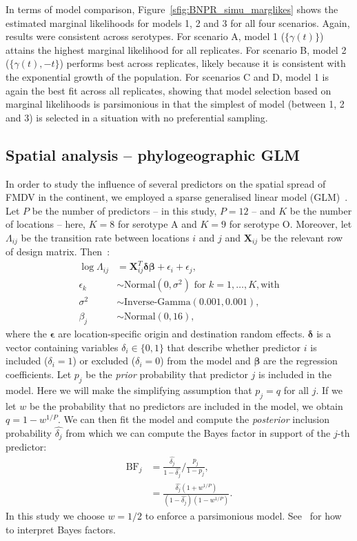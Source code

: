 \documentclass[a4paper,10pt]{article}
\begin{document}
In terms of model comparison, Figure~\ref{sfig:BNPR_simu_marglikes} shows the estimated marginal likelihoods for models 1, 2 and 3 for all four scenarios.
Again, results were consistent across serotypes. 
For scenario A, model 1 ($ \{ \gamma(t) \}$) attains the highest marginal likelihood for all replicates.
For scenario B, model 2 ($ \{ \gamma(t), -t\}$) performs best across replicates, likely because it is consistent with the exponential growth of the population.
For scenarios C and D, model 1 is again the best fit across all replicates, showing that model selection based on marginal likelihoods is parsimonious in that the simplest of model (between 1, 2 and 3) is selected in a situation with no preferential sampling.

\subsection*{Spatial analysis -- phylogeographic GLM}

In order to study the influence of several predictors on the spatial spread of FMDV in the continent, we employed a sparse generalised linear model (GLM)~\cite{M-Lemey2014,M-Dudas2017}.
Let $P$ be the number of predictors -- in this study, $P = 12$ -- and $K$ be the number of locations -- here, $K = 8$ for serotype A and $K = 9$ for serotype O.
Moreover, let $\Lambda_{ij}$ be the transition rate between locations $i$ and $j$ and $\boldsymbol X_{ij}$ be the relevant row of design matrix.
Then~\citep{M-Dudas2017}:
\begin{align*}
 \log \Lambda_{ij}  &= \boldsymbol X_{ij}^T \boldsymbol\delta \boldsymbol{\beta}
+ \epsilon_i + \epsilon_j, \\
\epsilon_k &\sim \text{Normal}(0, \sigma^2) \text{ for } k = 1, \ldots, K, \text{with} \\
\sigma^2 &\sim \text{Inverse-Gamma}(0.001, 0.001),\\
\beta_j &\sim \text{Normal}(0, 16),
\end{align*}
where the $\boldsymbol\epsilon$ are location-specific origin and destination random effects.
$\boldsymbol\delta$ is a vector containing variables $\delta_i \in \{0, 1\}$ that describe whether predictor $i$ is included ($\delta_i = 1$) or excluded ($\delta_i = 0$) from the model and $\boldsymbol\beta$ are the regression coefficients.
Let $p_j$ be the \textit{prior} probability that predictor $j$ is included in the model.
Here we will make the simplifying assumption that $p_j = q$ for all $j$.
If we let $w$ be the probability that no predictors are included in the model, we obtain  $q = 1 - w^{1/P}$.
We can then fit the model and compute the \textit{posterior} inclusion probability $\hat{\delta_j}$ from which we can compute the Bayes factor in support of the $j$-th predictor:
\begin{align*}
 \text{BF}_j &= \frac{\hat{\delta_j} }{1-\hat{\delta_j} }/\frac{p_j}{1-p_j}, \\
  &= \frac{\hat{\delta_j} (1 + w^{1/P})}{(1-\hat{\delta_j})(1 - w^{1/P}) }.
\end{align*}
In this study we choose $w = 1/2$ to enforce a parsimonious model.
See~\cite{M-KassRaftery1995} for how to interpret Bayes factors.
\end{document}

